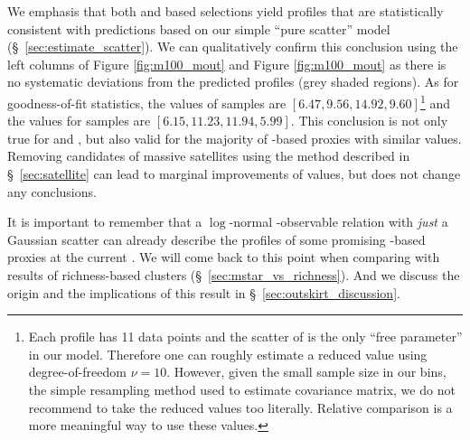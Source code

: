 \documentclass[fleqn,usenatbib,useAMS]{mnras}
\begin{document}
\begin{CJK*}{UTF8}{gbsn}
    We emphasis that both  and  based selections yield \dsigma{} profiles
    that are statistically consistent with predictions based on our simple ``pure scatter'' model
    (\S\ \ref{sec:estimate_scatter}). 
    We can qualitatively confirm this conclusion using the left columns of Figure
    \ref{fig:m100_mout} and Figure \ref{fig:m100_mout} as there is no systematic deviations from the
    predicted \dsigma{} profiles (grey shaded regions).
    As for goodness-of-fit statistics, the \chisq{} values of  samples are $[6.47, 9.56,
    14.92, 9.60]$\footnote{Each \dsigma{} profile has 11 data points and the scatter of \logmvir{}
    is the only ``free parameter'' in our model. 
    Therefore one can roughly estimate a reduced \chisq{} value using degree-of-freedom $\nu=10$.
    However, given the small sample size in our \topn{} bins, the simple resampling method used to
    estimate covariance matrix, we do not recommend to take the reduced \chisq{} values too
    literally. 
    Relative comparison is a more meaningful way to use these \chisq{} values.} and the values for
     samples are $[6.15, 11.23, 11.94, 5.99]$.
    This conclusion is not only true for  and , but also valid for the
    majority of \mstar{}-based \mvir{} proxies with similar \sigmvir{} values. 
    Removing candidates of massive satellites using the method described in \S\ \ref{sec:satellite}
    can lead to marginal improvements of \chisq{} values, but does not change any conclusions.

    It is important to remember that a $\log$-normal \mvir{}-observable relation with \emph{just} a
    Gaussian scatter can already describe the \dsigma{} profiles of some promising \mstar{}-based
    \mvir{} proxies at the current \snratio{}.
    We will come back to this point when comparing with \topn{} results of richness-based 
    clusters (\S\ \ref{sec:mstar_vs_richness}). 
    And we discuss the origin and the implications of this result in \S\
    \ref{sec:outskirt_discussion}.
    

\end{CJK*}
\end{document}
